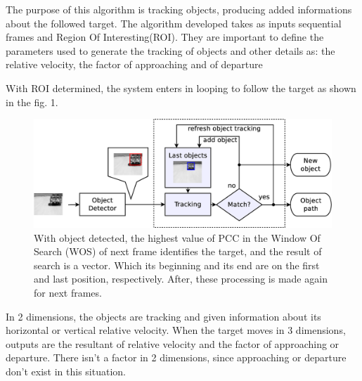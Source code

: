 The purpose of this algorithm is tracking objects, producing added informations about the followed target.
The algorithm developed takes as inputs sequential frames and Region Of Interesting(ROI). They are important to
define the parameters used to generate the tracking of objects and other details as: the relative velocity, the factor of 
approaching and of departure

With ROI determined, the system enters in looping to follow the target as shown in the fig. 1.

\begin{figure}[bhp]
\includegraphics[width=\columnwidth]{images/figure1-diagram1.eps}
\caption{With object detected, the highest value of PCC in the Window Of Search (WOS) of next frame identifies the target, 
and the result of search is a vector. 
Which its beginning and its end are on the first and last position, respectively. After, these processing is made again for 
next frames.}
\end{figure}

In 2 dimensions, the objects are tracking and given information about its horizontal or vertical relative velocity.
When the target moves in 3 dimensions, outputs are the resultant of relative velocity and the factor of approaching or departure. 
There isn't a factor in 2 dimensions, since approaching or departure don't exist in this situation.

